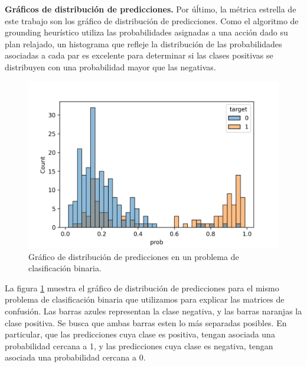 \textbf{Gráficos de distribución de predicciones.} Por úĺtimo, la métrica
estrella de este trabajo son los gráfico de distribución de predicciones. Como
el algoritmo de grounding heurístico utiliza las probabilidades asignadas a una
acción dado su plan relajado, un histograma que refleje la distribución de las
probabilidades asociadas a cada par es excelente para determinar si las clases
positivas se distribuyen con una probabilidad mayor que las negativas.

\begin{figure}[h!]
    \centering
    \includegraphics[width=0.7\linewidth]{figures/displot_example.png}
    \caption{Gráfico de distribución de predicciones en un problema de clasificación binaria.}
    \label{fig:distplot-example}
\end{figure}

La figura \ref{fig:distplot-example} muestra el gráfico de distribución de
predicciones para el mismo problema de clasificación binaria que utilizamos para
explicar las matrices de confusión. Las barras azules representan la clase
negativa, y las barras naranjas la clase positiva. Se busca que ambas barras
esten lo más separadas posibles. En particular, que las predicciones cuya clase
es positiva, tengan asociada una probabilidad cercana a 1, y las predicciones
cuya clase es negativa, tengan asociada una probabilidad cercana a 0.
